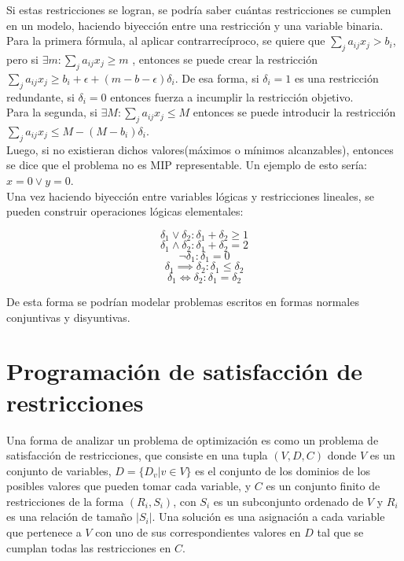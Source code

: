 \documentclass[12pt]{report}
\begin{document}
Si estas restricciones se logran, se podría saber cuántas restricciones se cumplen en un modelo, haciendo biyección entre una restricción y una variable binaria.\\

Para la primera fórmula, al aplicar contrarrecíproco, se quiere que $\sum_j a_{ij}x_j > b_i$, pero si $\exists m:\sum_j a_{ij}x_j\geq  m$ , entonces se puede crear la restricción $\sum_j a_{ij}x_j \geq  b_i+\epsilon+(m-b-\epsilon)\delta_i$. De esa forma, si $\delta_i=1$ es una restricción redundante, si $\delta_i=0$ entonces fuerza a incumplir la restricción objetivo.\\

Para la segunda, si $\exists M:\sum_j a_{ij}x_j\leq  M$ entonces se puede introducir la restricción $\sum_j a_{ij}x_j \leq  M-(M-b_i)\delta_i$. \\

Luego, si no existieran dichos valores(máximos o mínimos alcanzables), entonces se dice que el problema no es MIP representable. Un ejemplo de esto sería: $x=0\lor  y=0$.\\

Una vez haciendo biyección entre variables lógicas y restricciones lineales, se pueden construir operaciones lógicas elementales:

$$\delta_1 \lor  \delta_2:\delta_1+\delta_2\geq 1$$
$$\delta_1 \land \delta_2:\delta_1+\delta_2=2$$
$$\neg\delta_1 :\delta_1=0$$
$$\delta_1 \implies  \delta_2:\delta_1\leq  \delta_2$$
$$\delta_1 \iff \delta_2:\delta_1=\delta_2$$

De esta forma se podrían modelar problemas escritos en formas normales conjuntivas y disyuntivas.

\section{Programación de satisfacción de restricciones}

Una forma de analizar un problema de optimización es como un problema de satisfacción de restricciones, que consiste en una tupla $(V,D,C)$ donde $V$ es un conjunto de variables, $D=\{D_v|v\in V\}$ es el conjunto de los dominios de los posibles valores que pueden tomar cada variable, y $C$ es un conjunto finito de restricciones de la forma $(R_i,S_i)$, con $S_i$ es un subconjunto ordenado de $V$ y $R_i$ es una relación de tamaño $|S_i|$. Una solución es una asignación a cada variable que pertenece a $V$ con uno de sus correspondientes valores en $D$ tal que se cumplan todas las restricciones en $C$.
\end{document}
